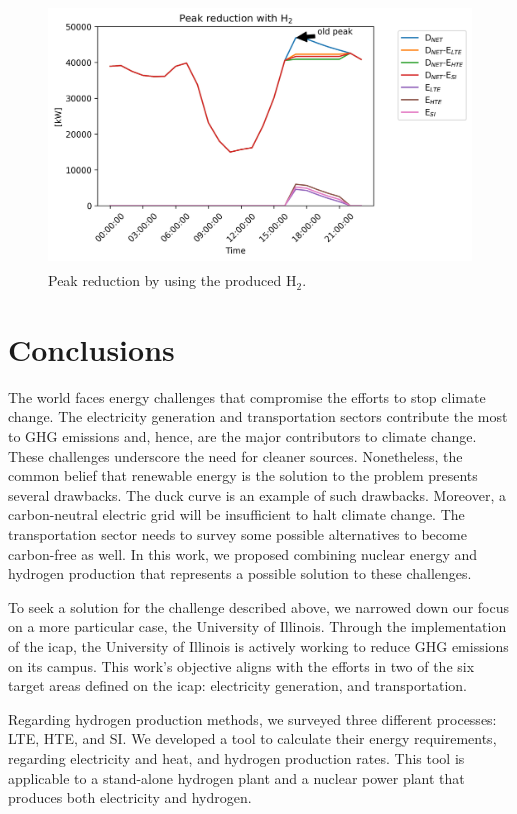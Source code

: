 \begin{figure}[htbp!]
    \centering
	\includegraphics[height=7cm]{figures-hydro/uiuc-hydro3}
	\hfill
	\caption{Peak reduction by using the produced H$_2$.}
	\label{fig:uiuc-duck3}
\end{figure}

\section{Conclusions}

The world faces energy challenges that compromise the efforts to stop climate change.
The electricity generation and transportation sectors contribute the most to GHG emissions and, hence, are the major contributors to climate change.
These challenges underscore the need for cleaner sources.
Nonetheless, the common belief that renewable energy is the solution to the problem presents several drawbacks.
The duck curve is an example of such drawbacks.
Moreover, a carbon-neutral electric grid will be insufficient to halt climate change.
The transportation sector needs to survey some possible alternatives to become carbon-free as well.
In this work, we proposed combining nuclear energy and hydrogen production that represents a possible solution to these challenges.

To seek a solution for the challenge described above, we narrowed down our focus on a more particular case, the University of Illinois.
Through the implementation of the \gls{icap}, the University of Illinois is actively working to reduce \gls{GHG} emissions on its campus.
This work's objective aligns with the efforts in two of the six target areas defined on the \gls{icap}: electricity generation, and transportation.

Regarding hydrogen production methods, we surveyed three different processes: \gls{LTE}, \gls{HTE}, and \gls{SI}.
We developed a tool to calculate their energy requirements, regarding electricity and heat, and hydrogen production rates.
This tool is applicable to a stand-alone hydrogen plant and a nuclear power plant that produces both electricity and hydrogen.

